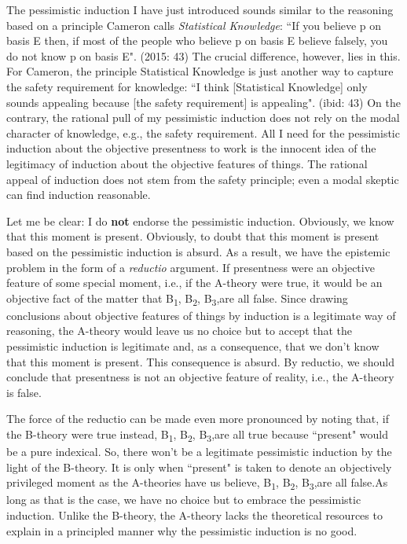 \documentclass[a4paper,12pt]{article}
\begin{document}
The pessimistic induction I have just introduced sounds similar to the reasoning based on a principle Cameron calls \emph{Statistical Knowledge}: ``If you believe p on basis E then, if most of the people who believe p on basis E believe falsely, you do not know p on basis E". (2015: 43) The crucial difference, however, lies in this. For Cameron, the principle Statistical Knowledge is just another way to capture the safety requirement for knowledge: ``I think [Statistical Knowledge] only sounds appealing because [the safety requirement] is appealing". (ibid: 43) On the contrary, the rational pull of my pessimistic induction does not rely on the modal character of knowledge, e.g., the safety requirement. All I need for the pessimistic induction about the objective presentness to work is the innocent idea of the legitimacy of induction about the objective features of things. The rational appeal of induction does not stem from the safety principle; even a modal skeptic can find induction reasonable.

Let me be clear: I do \textbf{not} endorse the pessimistic induction. Obviously, we know that this moment is present. Obviously, to doubt that this moment is present based on the pessimistic induction is absurd. As a result, we have the epistemic problem in the form of a \emph{reductio} argument. If presentness were an objective feature of some special moment, i.e., if the A-theory were true, it would be an objective fact of the matter that B\textsubscript{1}, B\textsubscript{2}, B\textsubscript{3},\textellipsis are all false. Since drawing conclusions about objective features of things by induction is a legitimate way of reasoning, the A-theory would leave us no choice but to accept that the pessimistic induction is legitimate and, as a consequence, that we don't know that this moment is present. This consequence is absurd. By reductio, we should conclude that presentness is not an objective feature of reality, i.e., the A-theory is false.

The force of the reductio can be made even more pronounced by noting that, if the B-theory were true instead, B\textsubscript{1}, B\textsubscript{2}, B\textsubscript{3},\textellipsis are all true because ``present" would be a pure indexical. So, there won't be a legitimate pessimistic induction by the light of the B-theory. It is only when ``present" is taken to denote an objectively privileged moment as the A-theories have us believe, B\textsubscript{1}, B\textsubscript{2}, B\textsubscript{3},\textellipsis are all false.\footnotemark As long as that is the case, we have no choice but to embrace the pessimistic induction. Unlike the B-theory, the A-theory lacks the theoretical resources to explain in a principled manner why the pessimistic induction is no good.

\end{document}
